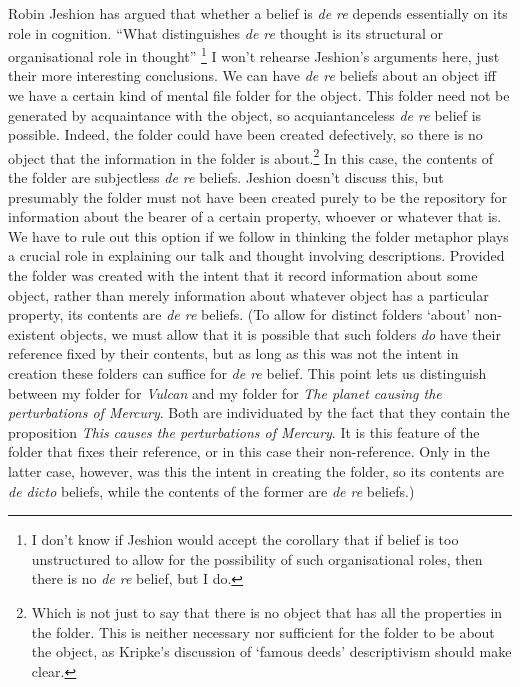 Robin Jeshion has argued that whether a belief is \textit{de re} depends essentially on its role in cognition. ``What distinguishes \textit{de re} thought is its structural or organisational role in thought'' \cite[67]{Jeshion2002}\footnote{I don't know if Jeshion would accept the corollary that if belief is too unstructured to allow for the possibility of such organisational roles, then there is no \textit{de re }belief, but I do.} I won't rehearse Jeshion's arguments here, just their more interesting conclusions. We can have \textit{de re} beliefs about an object iff we have a certain kind of mental file folder for the object. This folder need not be generated by acquaintance with the object, so acquiantanceless \textit{de re} belief is possible. Indeed, the folder could have been created defectively, so there is no object that the information in the folder is about.\footnote{Which is not just to say that there is no object that has all the properties in the folder. This is neither necessary nor sufficient for the folder to be about the object, as Kripke's discussion of `famous deeds' descriptivism should make clear.} In this case, the contents of the folder are subjectless \textit{de re} beliefs. Jeshion doesn't discuss this, but presumably the folder must not have been created purely to be the repository for information about the bearer of a certain property, whoever or whatever that is. We have to rule out this option if we follow \citet{Szabo2000} in thinking the folder metaphor plays a crucial role in explaining our talk and thought involving descriptions. Provided the folder was created with the intent that it record information about some object, rather than merely information about whatever object has a particular property, its contents are \textit{de re} beliefs. (To allow for distinct folders `about' non-existent objects, we must allow that it is possible that such folders \textit{do }have their reference fixed by their contents, but as long as this was not the intent in creation these folders can suffice for \textit{de re }belief. This point lets us distinguish between my folder for \textit{Vulcan }and my folder for \textit{The planet causing the perturbations of Mercury}. Both are individuated by the fact that they contain the proposition \textit{This }\textit{causes the perturbations of Mercury}. It is this feature of the folder that fixes their reference, or in this case their non-reference. Only in the latter case, however, was this the intent in creating the folder, so its contents are \textit{de dicto }beliefs, while the contents of the former are \textit{de re} beliefs.)

